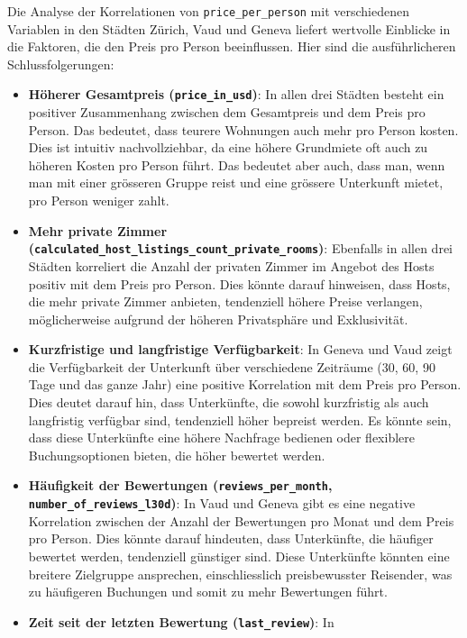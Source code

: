 \documentclass[
  journal,
]{IEEEtran}%
\begin{document}
Die Analyse der Korrelationen von \texttt{price\_per\_person} mit
verschiedenen Variablen in den Städten Zürich, Vaud und Geneva liefert
wertvolle Einblicke in die Faktoren, die den Preis pro Person
beeinflussen. Hier sind die ausführlicheren Schlussfolgerungen:

\begin{itemize}
\item
  \textbf{Höherer Gesamtpreis (\texttt{price\_in\_usd})}: In allen drei
  Städten besteht ein positiver Zusammenhang zwischen dem Gesamtpreis
  und dem Preis pro Person. Das bedeutet, dass teurere Wohnungen auch
  mehr pro Person kosten. Dies ist intuitiv nachvollziehbar, da eine
  höhere Grundmiete oft auch zu höheren Kosten pro Person führt. Das
  bedeutet aber auch, dass man, wenn man mit einer grösseren Gruppe
  reist und eine grössere Unterkunft mietet, pro Person weniger zahlt.
\item
  \textbf{Mehr private Zimmer
  (\texttt{calculated\_host\_listings\_count\_private\_rooms})}:
  Ebenfalls in allen drei Städten korreliert die Anzahl der privaten
  Zimmer im Angebot des Hosts positiv mit dem Preis pro Person. Dies
  könnte darauf hinweisen, dass Hosts, die mehr private Zimmer anbieten,
  tendenziell höhere Preise verlangen, möglicherweise aufgrund der
  höheren Privatsphäre und Exklusivität.
\item
  \textbf{Kurzfristige und langfristige Verfügbarkeit}: In Geneva und
  Vaud zeigt die Verfügbarkeit der Unterkunft über verschiedene
  Zeiträume (30, 60, 90 Tage und das ganze Jahr) eine positive
  Korrelation mit dem Preis pro Person. Dies deutet darauf hin, dass
  Unterkünfte, die sowohl kurzfristig als auch langfristig verfügbar
  sind, tendenziell höher bepreist werden. Es könnte sein, dass diese
  Unterkünfte eine höhere Nachfrage bedienen oder flexiblere
  Buchungsoptionen bieten, die höher bewertet werden.
\item
  \textbf{Häufigkeit der Bewertungen (\texttt{reviews\_per\_month},
  \texttt{number\_of\_reviews\_l30d})}: In Vaud und Geneva gibt es eine
  negative Korrelation zwischen der Anzahl der Bewertungen pro Monat und
  dem Preis pro Person. Dies könnte darauf hindeuten, dass Unterkünfte,
  die häufiger bewertet werden, tendenziell günstiger sind. Diese
  Unterkünfte könnten eine breitere Zielgruppe ansprechen,
  einschliesslich preisbewusster Reisender, was zu häufigeren Buchungen
  und somit zu mehr Bewertungen führt.
\item
  \textbf{Zeit seit der letzten Bewertung (\texttt{last\_review})}: In

\end{itemize}
\end{document}
